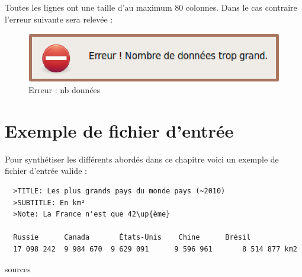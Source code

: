 Toutes les lignes ont une taille d’au maximum 80 colonnes. Dans le cas contraire l'erreur suivante sera relevée : 
\begin{figure}[htbp]
  \centering
  \includegraphics[scale=0.40]{img/enbdonnes}
  \caption{Erreur : nb données}
  \label{fig:enbdonees}
\end{figure}



\section{Exemple de fichier d'entrée}
Pour synthétiser les différents abordés dans ce chapitre voici un exemple de fichier d'entrée valide : 
\begin{verbatim}
  >TITLE: Les plus grands pays du monde pays (~2010)
  >SUBTITLE: En km²
  >Note: La France n'est que 42\up{ème}

  Russie      Canada 	   États-Unis    Chine 	    Brésil 
  17 098 242  9 984 670  9 629 091  	9 596 961  		8 514 877 km2 	
\end{verbatim}
sources \cite{wiki}
